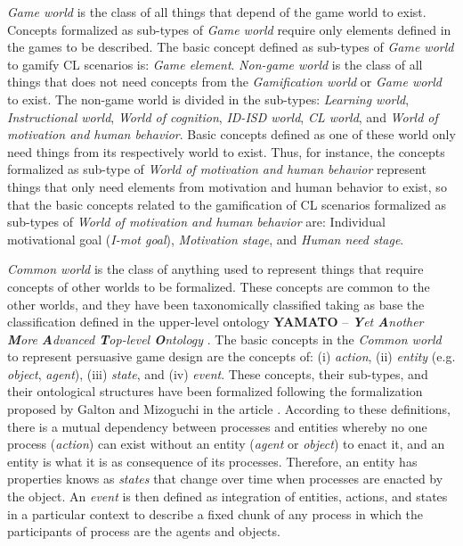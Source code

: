 \emph{Game world} is the class of all things that depend of the game world to exist. Concepts formalized as sub-types of \emph{Game world} require only elements defined in the games to be described. The basic concept defined as sub-types of \emph{Game world} to gamify CL scenarios is: \emph{Game element}. \emph{Non-game world} is the class of all things that does not need concepts from the \emph{Gamification world} or \emph{Game world} to exist. The non-game world is divided in the sub-types: \emph{Learning world}, \emph{Instructional world}, \emph{World of cognition}, \emph{ID-ISD world}, \emph{CL world}, and \emph{World of motivation and human behavior}. Basic concepts defined as one of these world only need things from its respectively world to exist. Thus, for instance, the concepts formalized as sub-type of \emph{World of motivation and human behavior} represent things that only need elements from motivation and human behavior to exist, so that the basic concepts related to the gamification of CL scenarios formalized as sub-types of \emph{World of motivation and human behavior} are: Individual motivational goal (\emph{I-mot goal}), \emph{Motivation stage}, and \emph{Human need stage}.

\emph{Common world} is the class of anything used to represent things that require concepts of other worlds to be formalized. These concepts are common to the other worlds, and they have been taxonomically classified taking as base the classification defined in the upper-level ontology \textbf{YAMATO} – \emph{\textbf{Y}et \textbf{A}nother \textbf{M}ore \textbf{A}dvanced \textbf{T}op-level \textbf{O}ntology} \cite{Mizoguchi2010}. The basic concepts in the \emph{Common world} to represent persuasive game design are the concepts of: (i) \emph{action}, (ii) \emph{entity} (e.g. \emph{object}, \emph{agent}), (iii) \emph{state}, and (iv) \emph{event}. These concepts, their sub-types, and their ontological structures have been formalized following the formalization proposed by Galton and Mizoguchi in the article  \cite{GaltonMizoguchi2009}. According to these definitions, there is a mutual dependency between processes and entities whereby no one process (\emph{action}) can exist without an entity (\emph{agent} or \emph{object}) to enact it, and an entity is what it is as consequence of its processes. Therefore, an entity has properties knows as \emph{states} that change over time when processes are enacted by the object. An \emph{event} is then defined as integration of entities, actions, and states in a particular context to describe a fixed chunk of any process in which the participants of process are the agents and objects.

